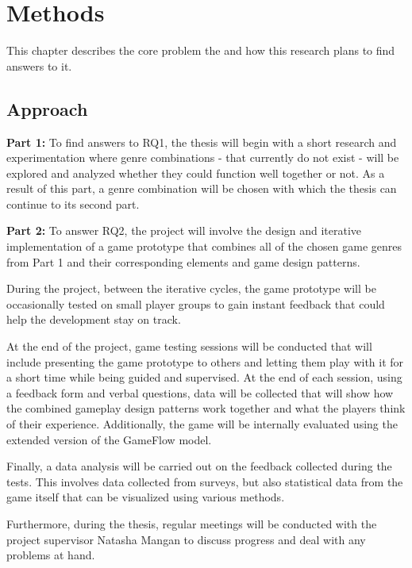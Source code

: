 \chapter{Methods} \label{Chapter:Methods}

This chapter describes the core problem the and how this research plans to find answers to it.



\section{Approach}


\textbf{Part 1:} To find answers to RQ1, the thesis will begin with a short research and experimentation where genre combinations - that currently do not exist - will be explored and analyzed whether they could function well together or not. As a result of this part, a genre combination will be chosen with which the thesis can continue to its second part.

\textbf{Part 2:} To answer RQ2, the project will involve the design and iterative implementation of a game prototype that combines all of the chosen game genres from Part 1 and their corresponding elements and game design patterns. 

During the project, between the iterative cycles, the game prototype will be occasionally tested on small player groups to gain instant feedback that could help the development stay on track.

At the end of the project, game testing sessions will be conducted that will include presenting the game prototype to others and letting them play with it for a short time while being guided and supervised. At the end of each session, using a feedback form and verbal questions\cite{björk2015Interviews}, data will be collected that will show how the combined gameplay design patterns work together and what the players think of their experience. Additionally, the game will be internally evaluated using the extended version of the GameFlow model\cite{sweetser2017gameflow}.

Finally, a data analysis will be carried out on the feedback collected during the tests. This involves data collected from surveys, but also statistical data from the game itself that can be visualized using various methods\cite{björk2015DataVisualization}. 

Furthermore, during the thesis, regular meetings will be conducted with the project supervisor Natasha Mangan to discuss progress and deal with any problems at hand.



